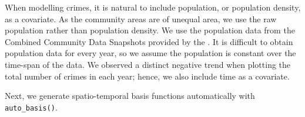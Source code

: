 \documentclass[12pt,a4paper]{article}
\begin{document}
When modelling crimes, it is natural to include population, or population density, as a covariate. 
As the community areas are of unequal area, we use the raw population rather than population density.
We use 
the population data from the Combined Community Data Snapshots provided by the \cite{Chicago_community_data_snapshots}.
It is difficult to obtain population data for every year, so we assume the population is constant over the time-span of the data.
 We observed a distinct negative trend when plotting the total number of crimes in each year; hence, we also include time as a covariate.

%


Next, we generate spatio-temporal basis functions automatically with \texttt{auto\_basis()}.  
 
\end{document}
